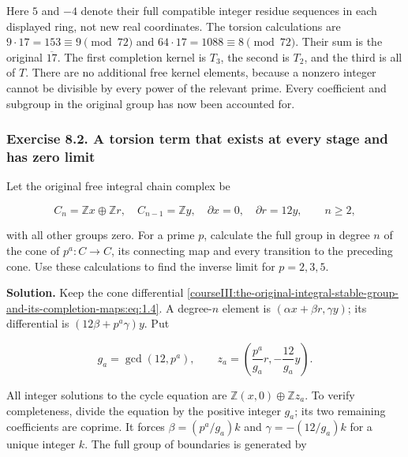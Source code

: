 Here \(5\) and \(-4\) denote their full compatible integer residue sequences in each displayed ring, not new real coordinates. The torsion calculations are \(9\cdot17=153\equiv9\pmod{72}\) and \(64\cdot17=1088\equiv8\pmod{72}\). Their sum is the original \(\overline{17}\). The first completion kernel is \(T_3\), the second is \(T_2\), and the third is all of \(T\). There are no additional free kernel elements, because a nonzero integer cannot be divisible by every power of the relevant prime. Every coefficient and subgroup in the original group has now been accounted for.

\subsubsection{Exercise 8.2. A torsion term that exists at every stage and has zero limit}
\label{courseIII:the-original-integral-stable-group-and-its-completion-maps:exercise-8.2}

\label{courseIII:integral-stable:8.2}

Let the original free integral chain complex be

\begin{equation}
C_n=\mathbb Zx\oplus\mathbb Zr,
 \quad C_{n-1}=\mathbb Zy,
 \quad\partial x=0,\quad\partial r=12y,
 \qquad n\geq2,
 \label{courseIII:the-original-integral-stable-group-and-its-completion-maps:eq:8.6}
\end{equation}

with all other groups zero. For a prime \(p\), calculate the full group in degree \(n\) of the cone of \(p^a:C\to C\), its connecting map and every transition to the preceding cone. Use these calculations to find the inverse limit for \(p=2,3,5\).

\textbf{Solution.} Keep the cone differential \eqref{courseIII:the-original-integral-stable-group-and-its-completion-maps:eq:1.4}. A degree-\(n\) element is
\((\alpha x+\beta r,\gamma y)\); its differential is
\((12\beta+p^a\gamma)y\). Put

\begin{equation}
g_a=\gcd(12,p^a),\qquad
 z_a=\left(\frac{p^a}{g_a}r,-\frac{12}{g_a}y\right).
 \label{courseIII:the-original-integral-stable-group-and-its-completion-maps:eq:8.7}
\end{equation}

All integer solutions to the cycle equation are \(\mathbb Z(x,0)\oplus\mathbb Zz_a\). To verify completeness, divide the equation by the positive integer \(g_a\); its two remaining coefficients are coprime. It forces \(\beta=(p^a/g_a)k\) and \(\gamma=-(12/g_a)k\) for a unique integer \(k\). The full group of boundaries is generated by

